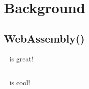 \section{Background}\label{sec:background}

\subsection{WebAssembly(\wasm)}
\wasm~\cite{wasmspec} is great!

\subsection{\spectec}
\spectec~\cite{spectec} is cool!
